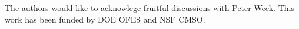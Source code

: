 \documentclass[preprint2]{aastex}
\begin{document}



\acknowledgements
The authors would like to acknowlege fruitful discussions with Peter Weck. This work has been funded by DOE OFES and NSF CMSO.
\end{document}
